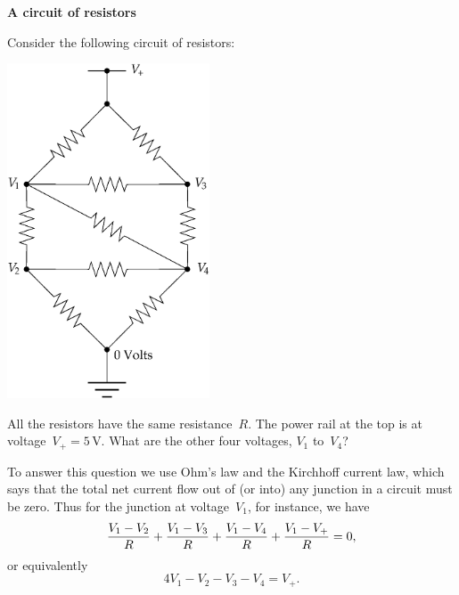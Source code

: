 \documentclass[12pt]{article}
\begin{document}
\par
\bigskip
{}\par
\noindent\hrulefill


\begin{exercises}


\exercise \textbf{A circuit of resistors}

\exskip Consider the following circuit of
resistors:
\begin{center}
\includegraphics[width=6cm]{resistor.eps}
\end{center}
All the resistors have the same resistance~$R$.  The power rail at the top
is at voltage~$V_+=5\,$V.  What are the other four voltages, $V_1$
to~$V_4$?

To answer this question we use Ohm's law and the Kirchhoff current
law, which says that the total net current flow out of (or into) any
junction in a circuit must be zero.  Thus for the junction at
voltage~$V_1$, for instance, we have
\begin{displaymath}
{V_1-V_2\over R} + {V_1-V_3\over R} + {V_1-V_4\over R} + {V_1-V_+\over R}
= 0,
\end{displaymath}
or equivalently
\begin{displaymath}
4V_1 - V_2 - V_3 - V_4 = V_+.
\end{displaymath}


\end{exercises}
\end{document}
